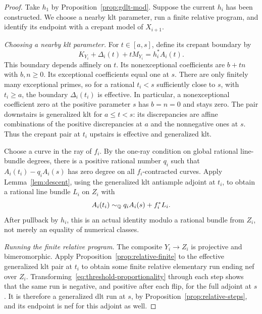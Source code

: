 \begin{proof}
Take $h_1$ by Proposition~\ref{prop:gdlt-mod}.  Suppose the current $h_i$
has been constructed.  We choose a nearby klt parameter, run a finite
relative program, and identify its endpoint with a crepant model of
$X_{i+1}$.

\smallskip\noindent
\emph{Choosing a nearby klt parameter.}
For $t\in[a,s]$, define its crepant boundary by
\[
 K_{Y_i}+\Delta_i(t)+tM_{Y_i}=h_i^*A_i(t).
\]
This boundary depends affinely on $t$.  Its nonexceptional coefficients
are $b+tn$ with $b,n\geq0$.  Its exceptional coefficients equal one at
$s$.  There are only finitely many exceptional primes, so for a rational
$t_i<s$ sufficiently close to $s$, with $t_i\geq a$, the boundary
$\Delta_i(t_i)$ is effective.  In particular, a nonexceptional coefficient
zero at the positive parameter $s$ has $b=n=0$ and stays zero.  The pair
downstairs is generalized klt for $a\leq t<s$: its discrepancies are
affine combinations of the positive discrepancies at $a$ and the
nonnegative ones at $s$.  Thus the crepant pair at $t_i$ upstairs is
effective and generalized klt.

Choose a curve in the ray of $f_i$.  By the one-ray condition on global
rational line-bundle degrees, there is a positive rational number $q_i$
such that $A_i(t_i)-q_iA_i(s)$ has zero degree on all $f_i$-contracted
curves.  Apply Lemma~\ref{lem:descent}, using the generalized klt
antiample adjoint at $t_i$, to obtain a rational line bundle $L_i$ on
$Z_i$ with
\begin{equation}\label{eq:threshold-proportionality}
 A_i(t_i)\sim_{\mathbb Q} q_i A_i(s)+f_i^*L_i.
\end{equation}
After pullback by $h_i$, this is an actual identity modulo a rational
bundle from $Z_i$, not merely an equality of numerical classes.

\smallskip\noindent
\emph{Running the finite relative program.}
The composite $Y_i\to Z_i$ is projective and bimeromorphic.  Apply
Proposition~\ref{prop:relative-finite} to the effective generalized klt
pair at $t_i$ to obtain some finite relative elementary run ending nef
over $Z_i$.  Transforming~\eqref{eq:threshold-proportionality} through
each step shows that the same run is negative, and positive after each
flip, for the full adjoint at $s$.  It is therefore a generalized dlt
run at $s$, by Proposition~\ref{prop:relative-steps}, and its endpoint
is nef for this adjoint as well.


\end{proof}
